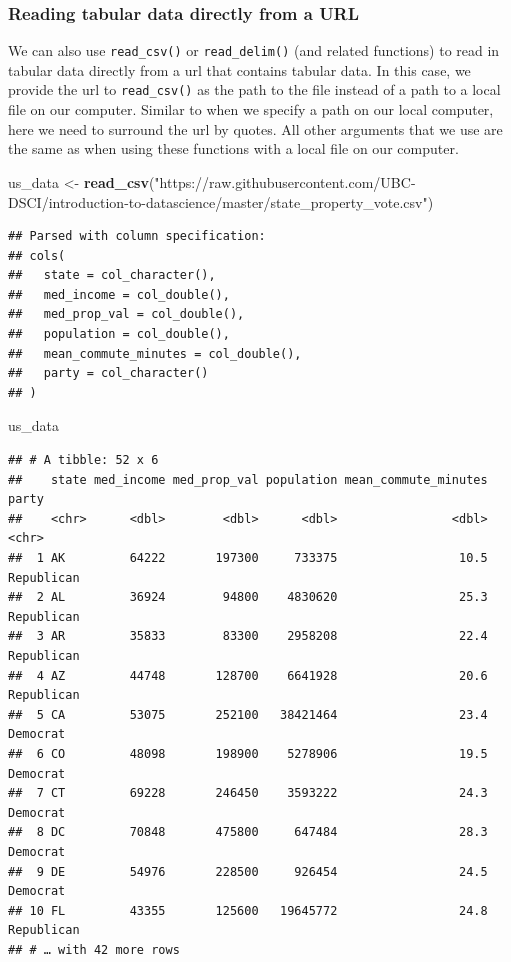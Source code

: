 \documentclass[
]{article}
\newenvironment{Shaded}{\begin{snugshade}}{\end{snugshade}}
\newcommand{\KeywordTok}[1]{\textcolor[rgb]{0.13,0.29,0.53}{\textbf{#1}}}
\newcommand{\NormalTok}[1]{#1}
\newcommand{\StringTok}[1]{\textcolor[rgb]{0.31,0.60,0.02}{#1}}
\begin{document}
\hypertarget{reading-tabular-data-directly-from-a-url}{%
\subsubsection{Reading tabular data directly from a
URL}\label{reading-tabular-data-directly-from-a-url}}

We can also use \texttt{read\_csv()} or \texttt{read\_delim()} (and
related functions) to read in tabular data directly from a url that
contains tabular data. In this case, we provide the url to
\texttt{read\_csv()} as the path to the file instead of a path to a
local file on our computer. Similar to when we specify a path on our
local computer, here we need to surround the url by quotes. All other
arguments that we use are the same as when using these functions with a
local file on our computer.

\begin{Shaded}
\begin{Highlighting}[]
\NormalTok{us\_data <{-}}\StringTok{ }\KeywordTok{read\_csv}\NormalTok{(}\StringTok{"https://raw.githubusercontent.com/UBC{-}DSCI/introduction{-}to{-}datascience/master/state\_property\_vote.csv"}\NormalTok{)}
\end{Highlighting}
\end{Shaded}

\begin{verbatim}
## Parsed with column specification:
## cols(
##   state = col_character(),
##   med_income = col_double(),
##   med_prop_val = col_double(),
##   population = col_double(),
##   mean_commute_minutes = col_double(),
##   party = col_character()
## )
\end{verbatim}

\begin{Shaded}
\begin{Highlighting}[]
\NormalTok{us\_data}
\end{Highlighting}
\end{Shaded}

\begin{verbatim}
## # A tibble: 52 x 6
##    state med_income med_prop_val population mean_commute_minutes party     
##    <chr>      <dbl>        <dbl>      <dbl>                <dbl> <chr>     
##  1 AK         64222       197300     733375                 10.5 Republican
##  2 AL         36924        94800    4830620                 25.3 Republican
##  3 AR         35833        83300    2958208                 22.4 Republican
##  4 AZ         44748       128700    6641928                 20.6 Republican
##  5 CA         53075       252100   38421464                 23.4 Democrat  
##  6 CO         48098       198900    5278906                 19.5 Democrat  
##  7 CT         69228       246450    3593222                 24.3 Democrat  
##  8 DC         70848       475800     647484                 28.3 Democrat  
##  9 DE         54976       228500     926454                 24.5 Democrat  
## 10 FL         43355       125600   19645772                 24.8 Republican
## # … with 42 more rows
\end{verbatim}
\end{document}
